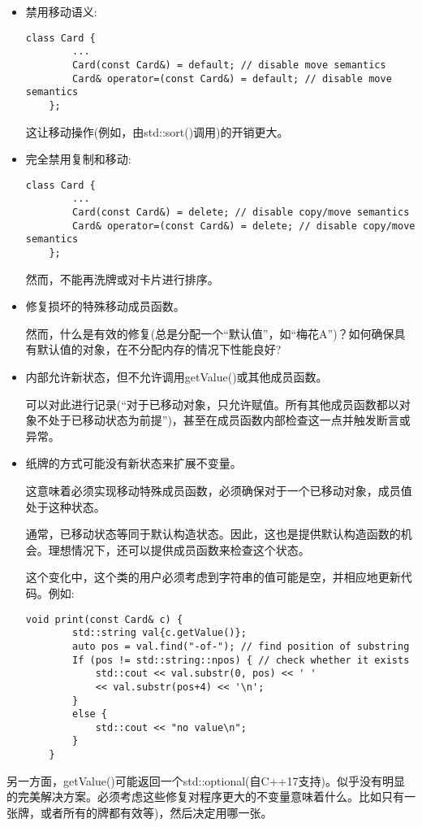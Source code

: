 \begin{itemize}
	\item 禁用移动语义:\par
	\begin{lstlisting}[caption={}]
	class Card {
		...
		Card(const Card&) = default; // disable move semantics
		Card& operator=(const Card&) = default; // disable move semantics
	};
	\end{lstlisting}
	这让移动操作(例如，由std::sort()调用)的开销更大。
	\item 完全禁用复制和移动:\par
	\begin{lstlisting}[caption={}]
	class Card {
		...
		Card(const Card&) = delete; // disable copy/move semantics
		Card& operator=(const Card&) = delete; // disable copy/move semantics
	};
	\end{lstlisting}
	然而，不能再洗牌或对卡片进行排序。
	\item 修复损坏的特殊移动成员函数。\par
	然而，什么是有效的修复(总是分配一个“默认值”，如“梅花A”)？如何确保具有默认值的对象，在不分配内存的情况下性能良好?
	\item 内部允许新状态，但不允许调用getValue()或其他成员函数。\par
	可以对此进行记录(“对于已移动对象，只允许赋值。所有其他成员函数都以对象不处于已移动状态为前提”)，甚至在成员函数内部检查这一点并触发断言或异常。
	\item 纸牌的方式可能没有新状态来扩展不变量。\par
	这意味着必须实现移动特殊成员函数，必须确保对于一个已移动对象，成员值处于这种状态。\par
	通常，已移动状态等同于默认构造状态。因此，这也是提供默认构造函数的机会。理想情况下，还可以提供成员函数来检查这个状态。\par
	这个变化中，这个类的用户必须考虑到字符串的值可能是空，并相应地更新代码。例如:\par
	\begin{lstlisting}[caption={}]
	void print(const Card& c) {
		std::string val{c.getValue()};
		auto pos = val.find("-of-"); // find position of substring
		If (pos != std::string::npos) { // check whether it exists
			std::cout << val.substr(0, pos) << ' '
			<< val.substr(pos+4) << '\n';
		}
		else {
			std::cout << "no value\n";
		}
	}
	\end{lstlisting}
\end{itemize}

另一方面，getValue()可能返回一个std::optional(自C++17支持)。似乎没有明显的完美解决方案。必须考虑这些修复对程序更大的不变量意味着什么。比如只有一张牌，或者所有的牌都有效等)，然后决定用哪一张。\par

